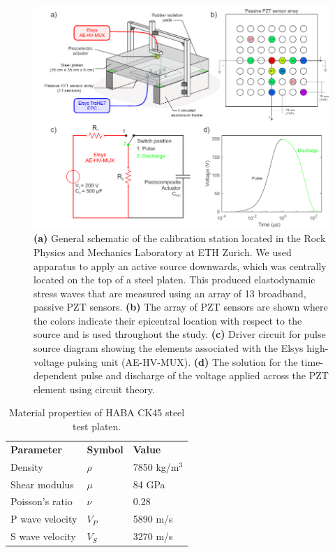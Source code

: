 \documentclass[preprint,3p, 11pt,authoryear]{elsarticle}
\begin{document}
\begin{figure}[ht]
     	\centering
\includegraphics[scale= 1.0]{FIG1.pdf} 
\caption{\textbf{(a)} General schematic of the calibration station located in the Rock Physics and Mechanics Laboratory at ETH Zurich. We used apparatus to apply an active source downwards, which was centrally located on the top of a steel platen. This produced elastodynamic stress waves that are measured using an array of 13 broadband, passive PZT sensors. \textbf{(b)} The array of PZT sensors are shown where the colors indicate their epicentral location with respect to the source and is used throughout the study. \textbf{(c)} Driver circuit for pulse source diagram showing the elements associated with the Elsys high-voltage pulsing unit (AE-HV-MUX). \textbf{(d)} The solution for the time-dependent pulse and discharge of the voltage applied across the PZT element using circuit theory. }
	\label{fig1} 
\end{figure}

\begin{table}[ht]
	\centering
	\caption{Material properties of HABA CK45 steel test platen.}
	\begin{tabular}{ m{5cm} m{2cm} m{4cm}} 
		\hline  
		\bf{Parameter} 			& \bf{Symbol} 		& \bf{Value}	\\
	    Density                 	& $\rho$            & 7850 kg/m$^{3}$\\
	    Shear modulus        & $\mu$             & 84 GPa \\
	    Poisson's ratio         & $\nu$             & 0.28\\
	    P wave velocity       & $V_{P}$           & 5890 m/s\\
	    S wave velocity       & $V_{S}$           & 3270 m/s\\	    
		\hline  	
	\end{tabular}
	\label{table1}
\end{table}
\end{document}
